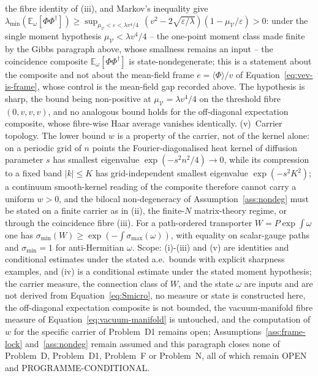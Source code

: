 the fibre identity of (iii), and Markov's inequality give \(\lambda_{\min}(\mathbb E_\omega[\Phi\Phi^\dagger])\ge\sup_{\mu_{\mathcal V}<\varepsilon<\lambda v^4/4}\,(v^2-2\sqrt{\varepsilon/\lambda})(1-\mu_{\mathcal V}/\varepsilon)>0\): under the single moment hypothesis \(\mu_{\mathcal V}<\lambda v^4/4\) -- the one-point moment class made finite by the Gibbs paragraph above, whose smallness remains an input -- the coincidence composite \(\mathbb E_\omega[\Phi\Phi^\dagger]\) is state-nondegenerate; this is a statement about the composite and not about the mean-field frame \(e=\langle\Phi\rangle/v\) of Equation~\eqref{eq:vev-is-frame}, whose control is the mean-field gap recorded above. The hypothesis is sharp, the bound being non-positive at \(\mu_{\mathcal V}=\lambda v^4/4\) on the threshold fibre \((0,v,v,v)\), and no analogous bound holds for the off-diagonal expectation composite, whose fibre-wise Haar average vanishes identically. (v)~Carrier topology. The lower bound \(w\) is a property of the carrier, not of the kernel alone: on a periodic grid of \(n\) points the Fourier-diagonalised heat kernel of diffusion parameter \(s\) has smallest eigenvalue \(\exp(-s^2 n^2/4)\to0\), while its compression to a fixed band \(|k|\le K\) has grid-independent smallest eigenvalue \(\exp(-s^2K^2)\); a continuum smooth-kernel reading of the composite therefore cannot carry a uniform \(w>0\), and the bilocal non-degeneracy of Assumption~\ref{ass:nondeg} must be stated on a finite carrier as in (ii), the finite-\(N\) matrix-theory regime, or through the coincidence fibre (iii). For a path-ordered transporter \(W=P\exp\int\omega\) one has \(\sigma_{\min}(W)\ge\exp(-\int\sigma_{\max}(\omega))\), with equality on scalar-gauge paths and \(\sigma_{\min}=1\) for anti-Hermitian \(\omega\). Scope: (i)-(iii) and (v) are identities and conditional estimates under the stated a.e.\ bounds with explicit sharpness examples, and (iv) is a conditional estimate under the stated moment hypothesis; the carrier measure, the connection class of \(W\), and the state \(\omega\) are inputs and are not derived from Equation~\eqref{eq:Smicro}, no measure or state is constructed here, the off-diagonal expectation composite is not bounded, the vacuum-manifold fibre measure of Equation~\eqref{eq:vacuum-manifold} is untouched, and the computation of \(w\) for the specific carrier of Problem~D1 remains open; Assumptions~\ref{ass:frame-lock} and~\ref{ass:nondeg} remain assumed and this paragraph closes none of Problem~D, Problem~D1, Problem~F or Problem~N, all of which remain OPEN and PROGRAMME-CONDITIONAL.
